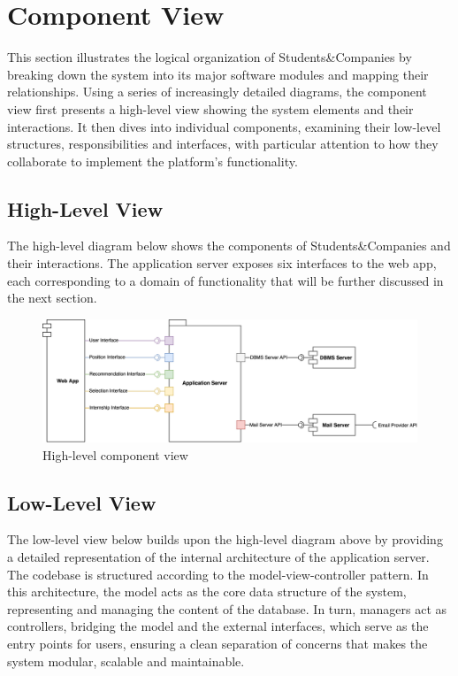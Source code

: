 \section{Component View}
This section illustrates the logical organization of Students\&Companies by breaking down the system into its major software modules and mapping their relationships.
Using a series of increasingly detailed diagrams, the component view first presents a high-level view showing the system elements and their interactions.
It then dives into individual components, examining their low-level structures, responsibilities and interfaces, with particular attention to how they collaborate to implement the platform's functionality.

\subsection{High-Level View}
The high-level diagram below shows the components of Students\&Companies and their interactions.
The application server exposes six interfaces to the web app, each corresponding to a domain of functionality that will be further discussed in the next section.

\begin{figure}[h]
    \centering
    \includegraphics[width=16cm]{images/component-view/high-level.png}
    \caption{High-level component view}
\end{figure}

\subsection{Low-Level View}
The low-level view below builds upon the high-level diagram above by providing a detailed representation of the internal architecture of the application server.
The codebase is structured according to the model-view-controller pattern.
In this architecture, the model acts as the core data structure of the system, representing and managing the content of the database.
In turn, managers act as controllers, bridging the model and the external interfaces, which serve as the entry points for users, ensuring a clean separation of concerns that makes the system modular, scalable and maintainable.

